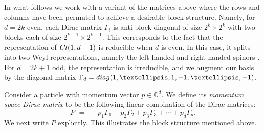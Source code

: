 \documentclass[english]{ourlematema}
\numberwithin{theorem}{section}
\theoremstyle{definition}
\newcommand{\CC}{\mathbb{C}}
\begin{document}
In what follows we work with a variant of the matrices
above where the rows and columns have been permuted
to achieve a desirable block structure.
Namely, for $d = 2k$ even, each Dirac matrix
$\Gamma_i$ is anti-block diagonal of size $2^k \times 2^k$ with two blocks each of size 
$2^{k - 1} \times 2^{k-1}$. This corresponds to the fact that the representation 
of ${\rm Cl}(1,d-1)$ is reducible when $d$ is even. In this case, it splits into two Weyl representations, 
namely the left handed and right handed spinors \cite[Section 4.2.1]{RdT}. For $d = 2k + 1$ odd, the representation is irreducible, and we augment
our basis by the diagonal matrix
 $\Gamma_{d} = {\rm diag}(1, \dots, 1, - 1, \dots, -1)$. 

Consider a particle with momentum vector $p\in \CC^d$. We define its
   \textit{momentum space Dirac matrix}  to be the following linear combination of the Dirac matrices:
\begin{equation}
\label{eq:Pmatrix}
P \,\,=\,\, -p_1 \Gamma_1 + p_2 \Gamma_2  + p_3 \Gamma_3 + \cdots + p_{d}\Gamma_{d}.
\end{equation}
We next write $P$ explicitly. This illustrates the block structure mentioned above.
\end{document}
